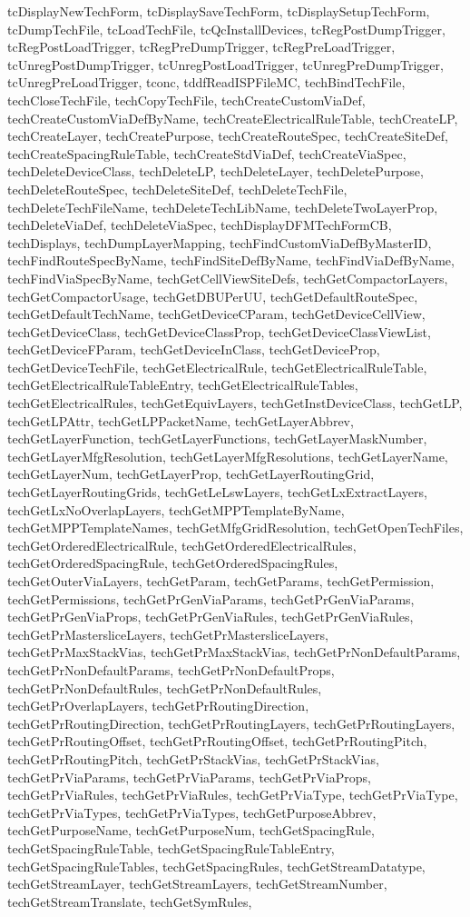 {{tcDisplayNewTechForm, tcDisplaySaveTechForm, tcDisplaySetupTechForm, tcDumpTechFile, tcLoadTechFile, tcQcInstallDevices, tcRegPostDumpTrigger, tcRegPostLoadTrigger, tcRegPreDumpTrigger, tcRegPreLoadTrigger, tcUnregPostDumpTrigger, tcUnregPostLoadTrigger, tcUnregPreDumpTrigger, tcUnregPreLoadTrigger, tconc, tddfReadISPFileMC, techBindTechFile, techCloseTechFile, techCopyTechFile, techCreateCustomViaDef, techCreateCustomViaDefByName, techCreateElectricalRuleTable, techCreateLP, techCreateLayer, techCreatePurpose, techCreateRouteSpec, techCreateSiteDef, techCreateSpacingRuleTable, techCreateStdViaDef, techCreateViaSpec, techDeleteDeviceClass, techDeleteLP, techDeleteLayer, techDeletePurpose, techDeleteRouteSpec, techDeleteSiteDef, techDeleteTechFile, techDeleteTechFileName, techDeleteTechLibName, techDeleteTwoLayerProp, techDeleteViaDef, techDeleteViaSpec, techDisplayDFMTechFormCB, techDisplays, techDumpLayerMapping, techFindCustomViaDefByMasterID, techFindRouteSpecByName, techFindSiteDefByName, techFindViaDefByName, techFindViaSpecByName, techGetCellViewSiteDefs, techGetCompactorLayers, techGetCompactorUsage, techGetDBUPerUU, techGetDefaultRouteSpec, techGetDefaultTechName, techGetDeviceCParam, techGetDeviceCellView, techGetDeviceClass, techGetDeviceClassProp, techGetDeviceClassViewList, techGetDeviceFParam, techGetDeviceInClass, techGetDeviceProp, techGetDeviceTechFile, techGetElectricalRule, techGetElectricalRuleTable, techGetElectricalRuleTableEntry, techGetElectricalRuleTables, techGetElectricalRules, techGetEquivLayers, techGetInstDeviceClass, techGetLP, techGetLPAttr, techGetLPPacketName, techGetLayerAbbrev, techGetLayerFunction, techGetLayerFunctions, techGetLayerMaskNumber, techGetLayerMfgResolution, techGetLayerMfgResolutions, techGetLayerName, techGetLayerNum, techGetLayerProp, techGetLayerRoutingGrid, techGetLayerRoutingGrids, techGetLeLswLayers, techGetLxExtractLayers, techGetLxNoOverlapLayers, techGetMPPTemplateByName, techGetMPPTemplateNames, techGetMfgGridResolution, techGetOpenTechFiles, techGetOrderedElectricalRule, techGetOrderedElectricalRules, techGetOrderedSpacingRule, techGetOrderedSpacingRules, techGetOuterViaLayers, techGetParam, techGetParams, techGetPermission, techGetPermissions, techGetPrGenViaParams, techGetPrGenViaParams, techGetPrGenViaProps, techGetPrGenViaRules, techGetPrGenViaRules, techGetPrMastersliceLayers, techGetPrMastersliceLayers, techGetPrMaxStackVias, techGetPrMaxStackVias, techGetPrNonDefaultParams, techGetPrNonDefaultParams, techGetPrNonDefaultProps, techGetPrNonDefaultRules, techGetPrNonDefaultRules, techGetPrOverlapLayers, techGetPrRoutingDirection, techGetPrRoutingDirection, techGetPrRoutingLayers, techGetPrRoutingLayers, techGetPrRoutingOffset, techGetPrRoutingOffset, techGetPrRoutingPitch, techGetPrRoutingPitch, techGetPrStackVias, techGetPrStackVias, techGetPrViaParams, techGetPrViaParams, techGetPrViaProps, techGetPrViaRules, techGetPrViaRules, techGetPrViaType, techGetPrViaType, techGetPrViaTypes, techGetPrViaTypes, techGetPurposeAbbrev, techGetPurposeName, techGetPurposeNum, techGetSpacingRule, techGetSpacingRuleTable, techGetSpacingRuleTableEntry, techGetSpacingRuleTables, techGetSpacingRules, techGetStreamDatatype, techGetStreamLayer, techGetStreamLayers, techGetStreamNumber, techGetStreamTranslate, techGetSymRules, }}
